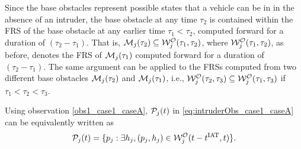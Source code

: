 \begin{itemize}[leftmargin=*]
\begin{observation} \label{obs1_case1_caseA}
Since the base obstacles represent possible states that a vehicle can be in in the absence of an intruder, the base obstacle at any time $\tau_2$ is contained within the FRS of the base obstacle at any earlier time $\tau_1 < \tau_2$, computed forward for a duration of $(\tau_2-\tau_1).$ That is, $\mathcal{M}_j(\tau_2) \subseteq \mathcal{W}_{j}^{\mathcal{O}}(\tau_1, \tau_2)$, where $\mathcal{W}_{j}^{\mathcal{O}}(\tau_1, \tau_2)$, as before, denotes the FRS of $\mathcal{M}_j(\tau_1)$ computed forward for a duration of $(\tau_2-\tau_1)$. The same argument can be applied to the FRSs computed from two different base obstacles $\mathcal{M}_j(\tau_2)$ and $\mathcal{M}_j(\tau_1)$, i.e., $\mathcal{W}_{j}^{\mathcal{O}}(\tau_2, \tau_3) \subseteq \mathcal{W}_{j}^{\mathcal{O}}(\tau_1, \tau_3)$ if $\tau_1 < \tau_2 < \tau_3$.
\end{observation}

Using observation \ref{obs1_case1_caseA}, $\mathcal{P}_j(t)$ in \eqref{eq:intruderObs_case1_caseA} can be equivalently written as
\begin{equation} \label{eq:intruderObs_case1_caseA_inter}
\pfrs_j(t) = \{p_j: \exists \npos_j, (p_j, \npos_j) \in \frs_{j}^{\mathcal{O}}(t-\iat, t) \}.
\end{equation}


\end{itemize}
